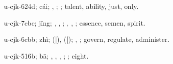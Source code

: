 \begin{multicols}{2}
{\cjkgGlue{}u-cjk-624d; cái; \cjkgGlue{}, \cjkgGlue{}; \cjkgGlue{}; talent, ability, just, only.

\cjkgGlue{}u-cjk-7cbe; jīng; \cjkgGlue{}, \cjkgGlue{}, \cjkgGlue{}; \cjkgGlue{}, \cjkgGlue{}, \cjkgGlue{}; essence, semen, spirit.

\cjkgGlue{}u-cjk-6cbb; zhì; \cjkgGlue{}\cjkgGlue{}(\cjkgGlue{}|\cjkgGlue{}), \cjkgGlue{}\cjkgGlue{}(\cjkgGlue{}|\cjkgGlue{}); \cjkgGlue{}, \cjkgGlue{}; govern, regulate, administer.

\cjkgGlue{}u-cjk-516b; bā; \cjkgGlue{}, \cjkgGlue{}\cjkgGlue{}\cjkgGlue{}, \cjkgGlue{}\cjkgGlue{}\cjkgGlue{}, \cjkgGlue{}; \cjkgGlue{}; eight.

}
\end{multicols}
